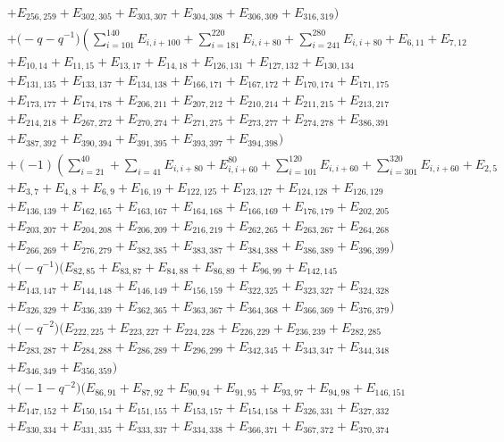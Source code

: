 \documentclass[10pt,a4paper]{amsart}
\numberwithin{equation}{section}
\theoremstyle{definition}
\begin{document}
\begin{align*}
&+E_{256,259}+E_{302,305}+E_{303,307}+E_{304,308}+E_{306,309}+E_{316,319})
\\
&+\bigl(-q - q^{-1}\bigr)\left(\sum_{i=101}^{140}E_{i,i+100}+\sum_{i=181}^{220}E_{i,i+80}+ \sum_{i=241}^{280}E_{i,i+80}+E_{6,11}+E_{7,12}\right.\\
&+E_{10,14}+E_{11,15}+E_{13,17}+E_{14,18}+E_{126,131}+E_{127,132}+E_{130,134}\\
&+E_{131,135}+E_{133,137}+E_{134,138}+E_{166,171}+E_{167,172}+E_{170,174}+E_{171,175}\\
&+E_{173,177}+E_{174,178}+E_{206,211}+E_{207,212}+E_{210,214}+E_{211,215}+E_{213,217}\\
&+E_{214,218}+E_{267,272}+E_{270,274}+E_{271,275}+E_{273,277}+E_{274,278}+E_{386,391}\\
&+E_{387,392}+E_{390,394}+E_{391,395}+E_{393,397}+E_{394,398})\\
&
+(-1)\left(\sum_{i=21}^{40} + \sum_{i=41} E_{i,i+80}+E_{i,i+60}^{80}+\sum_{i=101}^{120}E_{i,i+60}+\sum_{i=301}^{320}E_{i,i+60}+E_{2,5}\right. \\
&+E_{3,7}+E_{4,8}+E_{6,9}+E_{16,19}+E_{122,125}+E_{123,127}+E_{124,128}+E_{126,129}\\
&+E_{136,139}+E_{162,165}+E_{163,167}+E_{164,168}+E_{166,169}+E_{176,179}+E_{202,205}\\
&+E_{203,207}+E_{204,208}+E_{206,209}+E_{216,219}+E_{262,265}+E_{263,267}+E_{264,268}\\
&+E_{266,269}+E_{276,279}+E_{382,385}+E_{383,387}+E_{384,388}+E_{386,389}+E_{396,399})
\\
&+\bigl(-q^{-1}\bigr)(E_{82,85}+E_{83,87}+E_{84,88}+E_{86,89}+E_{96,99}+E_{142,145}\\
&+E_{143,147}+E_{144,148}+E_{146,149}+E_{156,159}+E_{322,325}+E_{323,327}+E_{324,328}\\
&+E_{326,329}+E_{336,339}+E_{362,365}+E_{363,367}+E_{364,368}+E_{366,369}+E_{376,379})
\\
&+\bigl(-q^{-2}\bigr)(E_{222,225}+E_{223,227}+E_{224,228}+E_{226,229}+E_{236,239}+E_{282,285}\\
&+E_{283,287}+E_{284,288}+E_{286,289}+E_{296,299}+E_{342,345}+E_{343,347}+E_{344,348}\\
&+E_{346,349}+E_{356,359})\\
&+\bigl(-1 - q^{-2}\bigr)(E_{86,91}+E_{87,92}+E_{90,94}+E_{91,95}+E_{93,97}+E_{94,98}+E_{146,151}\\
&+E_{147,152}+E_{150,154}+E_{151,155}+E_{153,157}+E_{154,158}+E_{326,331}+E_{327,332}\\
&+E_{330,334}+E_{331,335}+E_{333,337}+E_{334,338}+E_{366,371}+E_{367,372}+E_{370,374}\\

\end{align*}
\end{document}
